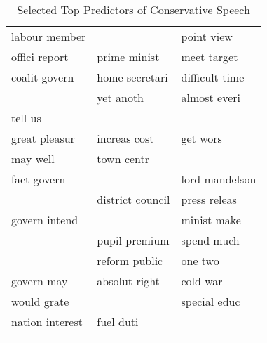 \begingroup\scriptsize
\begin{longtable}{p{}p{}p{}}
\caption{Selected Top Predictors of Conservative Speech} \\ 
  \hline
  \hline
  labour member & \color{red}{govern fail} & point view \\ 
  offici report & prime minist & meet target \\ 
  coalit govern & home secretari & difficult time \\ 
  \color{red}{polit correct} & yet anoth & almost everi \\ 
  tell us & \color{red}{budget deficit} & \color{red}{conserv believ} \\ 
  great pleasur & increas cost & get wors \\ 
  may well & town centr & \color{red}{rule law} \\ 
  fact govern & \color{red}{person account} & lord mandelson \\ 
  \color{red}{red tape} & district council & press releas \\ 
  govern intend & \color{red}{govern failur} & minist make \\ 
  \color{red}{last govern} & pupil premium & spend much \\ 
  \color{red}{new labour} & reform public & one two \\ 
  govern may & absolut right & cold war \\ 
  would grate & \color{red}{margaret thatcher} & special educ \\ 
  nation interest & fuel duti &  \\ 
\hline
\hline
\label{tab:top_100c}
\end{longtable}
\endgroup
